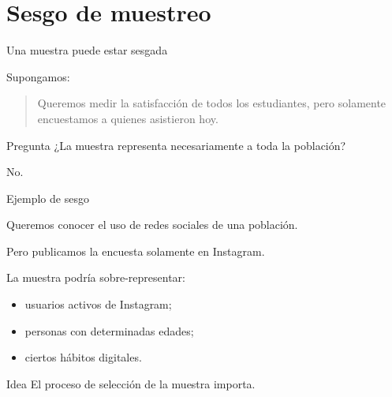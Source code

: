 \documentclass[aspectratio=169,11pt]{beamer}
\begin{document}
\section{Sesgo de muestreo}

\begin{frame}{Una muestra puede estar sesgada}

Supongamos:

\begin{quote}

Queremos medir la satisfacción de todos los estudiantes,
pero solamente encuestamos a quienes asistieron hoy.

\end{quote}

\vspace{0.5cm}

\begin{alertblock}{Pregunta}
¿La muestra representa necesariamente a toda la población?
\end{alertblock}

No.

\end{frame}


\begin{frame}{Ejemplo de sesgo}

Queremos conocer el uso de redes sociales de una población.

Pero publicamos la encuesta solamente en Instagram.

\vspace{0.4cm}

La muestra podría sobre-representar:

\begin{itemize}

    \item usuarios activos de Instagram;

    \item personas con determinadas edades;

    \item ciertos hábitos digitales.

\end{itemize}

\vspace{0.3cm}

\begin{block}{Idea}
El proceso de selección de la muestra importa.
\end{block}

\end{frame}
\end{document}
